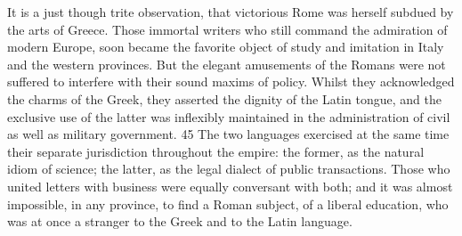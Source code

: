 

It is a just though trite observation, that victorious Rome was
herself subdued by the arts of Greece. Those immortal writers who
still command the admiration of modern Europe, soon became the
favorite object of study and imitation in Italy and the western
provinces. But the elegant amusements of the Romans were not
suffered to interfere with their sound maxims of policy. Whilst
they acknowledged the charms of the Greek, they asserted the
dignity of the Latin tongue, and the exclusive use of the latter
was inflexibly maintained in the administration of civil as well
as military government. 45 The two languages exercised at the
same time their separate jurisdiction throughout the empire: the
former, as the natural idiom of science; the latter, as the legal
dialect of public transactions. Those who united letters with
business were equally conversant with both; and it was almost
impossible, in any province, to find a Roman subject, of a
liberal education, who was at once a stranger to the Greek and to
the Latin language.


